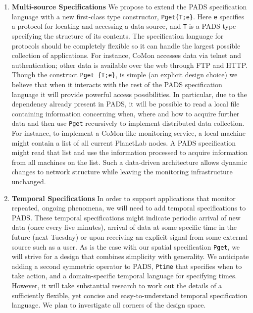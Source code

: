 \begin{enumerate}
\item {\bf Multi-source Specifications}  
We propose to extend the PADS specification language with a new
first-class type constructor, \texttt{Pget\{T;e\}}.  Here \texttt{e}
specifies a protocol for locating and accessing a data source, and
\texttt{T} is a PADS type specifying the structure of its contents.
The specification language for protocols should be completely flexible
so it can handle the largest possible collection of applications.  For
instance, CoMon accesses data via telnet and authentication; other
data is available over the web through FTP and HTTP.  
Though the construct \texttt{Pget \{T;e\}}, 
is simple (an explicit design choice) we believe that 
when it interacts with the rest of the PADS
specification language it will provide powerful access possibilities.
In particular, due to the dependency already present in PADS, it will
be possible to read a local file containing information
concerning when, where and how to acquire further data and
then use \texttt{Pget} recursively to implement distributed data collection. 
For instance, to implement a CoMon-like monitoring
service, a local machine might contain a list of all current
PlanetLab nodes.  A PADS specification might read that list and use
the information processed to acquire information from all machines on
the list.  Such a data-driven architecture allows dynamic changes
to network structure while leaving the monitoring infrastructure unchanged.

\item {\bf Temporal Specifications}
In order to support applications that monitor repeated, ongoing phenomena, we
will need to add temporal specifications to PADS.  These
temporal specifications might indicate periodic arrival of new data
(once every five minutes), arrival of data at some specific time in
the future (next Tuesday) or upon receiving an explicit signal from
some external source such as a user.  
As is the case with our spatial specification
\texttt{Pget}, we will strive for a design that combines simplicity
with generality.  We anticipate adding a second symmetric operator to PADS,
\texttt{Ptime} that specifies when to take action, and a 
domain-specific temporal language for specifying times.  However, 
it will take substantial research
to work out the details of a sufficiently flexible, yet concise
and easy-to-understand temporal specification language. 
We plan to investigate all corners of the design space.


\end{enumerate}
